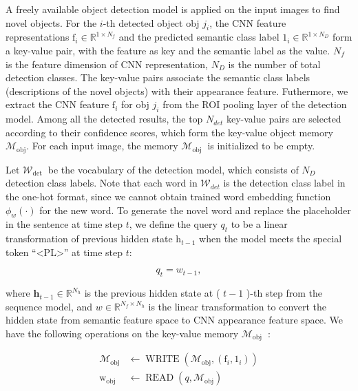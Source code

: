 \documentclass[a4paper, 11pt]{article} %
\begin{document}
A freely available object detection model is applied on the input images to find novel
objects. For the $i$-th detected object obj $j_{i}$, the CNN feature representations
$\mathrm{f}_{i} \in \mathbb{R}^{1 \times N_{f}}$ and the predicted semantic class label
$1_{i} \in \mathbb{R}^{1 \times N_{D}}$ form a key-value pair, with the feature as key
and the semantic label as the value. $N_{f}$ is the feature dimension of CNN representation,
$N_{D}$ is the number of total detection classes. The key-value pairs associate the semantic
class labels (descriptions of the novel objects) with their appearance feature. Futhermore,
we extract the CNN feature $\mathrm{f}_{i}$ for obj $j_{i}$ from the ROI pooling layer of
the detection model. Among all the detected results, the top $N_{d e t}$ key-value pairs
are selected according to their confidence scores, which form the key-value object memory
$\mathcal{M}_{\mathrm{obj}}$. For each input image, the memory $\mathcal{M}_{\text {obj }}$
is initialized to be empty.

Let $\mathcal{W}_{\text {det }}$ be the vocabulary of the detection model, which consists
of $N_{D}$ detection class labels. Note that each word in $\mathcal{W}_{d e t}$ is the
detection class label in the one-hot format, since we cannot obtain trained word embedding
function $\phi_{w}(\cdot)$ for the new word. To generate the novel word and replace the
placeholder in the sentence at time step $t$, we define the query $q_{t}$ to be a linear
transformation of previous hidden state $\mathrm{h}_{t-1}$ when the model meets the special
token ``\textless PL\textgreater'' at time step $t$:

$$
	q_{t}=w_{t-1},
$$

where $\mathbf{h}_{t-1} \in \mathbb{R}^{N_{h}}$ is the previous hidden state at ( $t-1$ )-th
step from the sequence model, and $w \in \mathbb{R}^{N_{f} \times N_{h}}$ is the linear
transformation to convert the hidden state from semantic feature space to CNN appearance
feature space. We have the following operations on the key-value memory
$\mathcal{M}_{\text {obj }}$ :

$$
	\begin{aligned}
		\mathcal{M}_{\mathrm{obj}} & \leftarrow \operatorname{WRITE}\left(\mathcal{M}_{\mathrm{obj}},\left(\mathrm{f}_{i}, 1_{i}\right)\right) \\
		\mathrm{w}_{\mathrm{obj}}  & \leftarrow \operatorname{READ}\left(q, \mathcal{M}_{\mathrm{obj}}\right)
	\end{aligned}
$$
\end{document}
